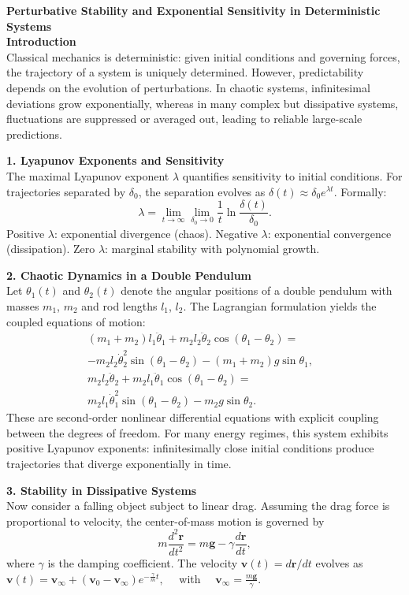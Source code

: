 \begin{technical}
{\Large\textbf{Perturbative Stability and Exponential Sensitivity in Deterministic Systems}}\\[0.7em]

\textbf{Introduction}\\[0.5em]
Classical mechanics is deterministic: given initial conditions and governing forces, the trajectory of a system is uniquely determined. However, predictability depends on the evolution of perturbations. In chaotic systems, infinitesimal deviations grow exponentially, whereas in many complex but dissipative systems, fluctuations are suppressed or averaged out, leading to reliable large-scale predictions.

\textbf{1. Lyapunov Exponents and Sensitivity}\\
The maximal Lyapunov exponent $\lambda$ quantifies sensitivity to initial conditions. For trajectories separated by $\delta_0$, the separation evolves as $\delta(t) \approx \delta_0 e^{\lambda t}$. Formally:
\[
\lambda = \lim_{t \to \infty} \lim_{\delta_0 \to 0} \frac{1}{t} \ln \frac{\delta(t)}{\delta_0}.
\]
Positive $\lambda$: exponential divergence (chaos). Negative $\lambda$: exponential convergence (dissipation). Zero $\lambda$: marginal stability with polynomial growth.

\textbf{2. Chaotic Dynamics in a Double Pendulum}\\
Let $\theta_1(t)$ and $\theta_2(t)$ denote the angular positions of a double pendulum with masses $m_1$, $m_2$ and rod lengths $l_1$, $l_2$. The Lagrangian formulation yields the coupled equations of motion:
\begin{align*}
(m_1 + m_2) l_1 \ddot{\theta}_1 
+ m_2 l_2 \ddot{\theta}_2 \cos(\theta_1 - \theta_2) 
=&\\ -m_2 l_2 \dot{\theta}_2^2 \sin(\theta_1 - \theta_2) 
- (m_1 + m_2) g \sin\theta_1, \\[0.5em]
m_2 l_2 \ddot{\theta}_2 
+ m_2 l_1 \ddot{\theta}_1 \cos(\theta_1 - \theta_2) 
=&\\ m_2 l_1 \dot{\theta}_1^2 \sin(\theta_1 - \theta_2) 
- m_2 g \sin\theta_2.
\end{align*}
These are second-order nonlinear differential equations with explicit coupling between the degrees of freedom. For many energy regimes, this system exhibits positive Lyapunov exponents: infinitesimally close initial conditions produce trajectories that diverge exponentially in time.

\textbf{3. Stability in Dissipative Systems}\\
Now consider a falling object subject to linear drag. Assuming the drag force is proportional to velocity, the center-of-mass motion is governed by
\[
m \frac{d^2 \mathbf{r}}{dt^2} = m \mathbf{g} - \gamma \frac{d\mathbf{r}}{dt},
\]
where $\gamma$ is the damping coefficient. The velocity $\mathbf{v}(t) = d\mathbf{r}/dt$ evolves as $\mathbf{v}(t) = \mathbf{v}_\infty + (\mathbf{v}_0 - \mathbf{v}_\infty) e^{-\frac{\gamma}{m} t}, \quad$ with $\quad \mathbf{v}_\infty = \frac{m \mathbf{g}}{\gamma}.$


\end{technical}
